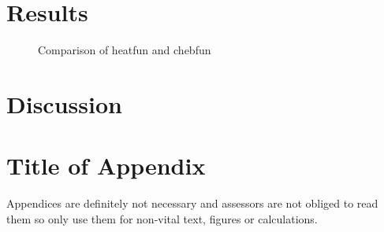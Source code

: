 \documentclass[12pt, a4paper]{article}
\begin{document}
  \section{Results}
  \begin{figure}[H]
    \centering
    \caption{Comparison of heatfun and chebfun}
  \end{figure}

  \section{Discussion}

  \printbibliography

  \appendix
  \section{Title of Appendix}
  Appendices are definitely not necessary and assessors are not obliged to read them so only use them for non-vital text, figures or calculations.
\end{document}
